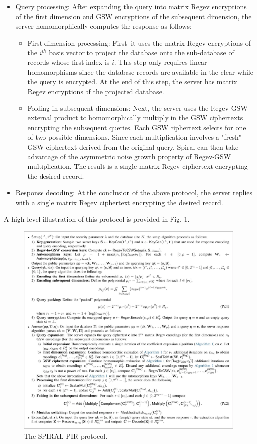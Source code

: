\begin{itemize}
    \item Query processing: After expanding the query into matrix Regev encryptions of the
    first dimension and GSW encryptions of the subsequent dimension, the server
    homomorphically computes the response as follows:

    \begin{itemize}
        \item First dimension processing: First, it uses the matrix Regev encryptions of
        the $i^{th}$ basis vector to project the database onto the sub-database of records
        whose first index is $i$. This step only requires linear homomorphisms since the
        database records are available in the clear while the query is encrypted. At the
        end of this step, the server has matrix Regev encryptions of the projected
        database.

        \item Folding in subsequent dimensions: Next, the server uses the Regev-GSW
        external product to homomorphically multiply in the GSW ciphertexts encrypting the
        subsequent queries. Each GSW ciphertext selects for one of two possible
        dimensions. Since each multiplication involves a "fresh" GSW ciphertext derived
        from the original query, Spiral can then take advantage of the asymmetric noise
        growth property of Regev-GSW multiplication. The result is a single matrix Regev
        ciphertext encrypting the desired record.
    \end{itemize}

    \item Response decoding: At the conclusion of the above protocol, the server replies
    with a single matrix Regev ciphertext encrypting the desired record.
\end{itemize}

A high-level illustration of this protocol is provided in Fig. 1.

\begin{figure}[h]
    \centering
    \includegraphics[width=\linewidth]{Images/Spiral_Protocol.png}
    \caption{The SPIRAL PIR protocol.}
    \label{fig:protocol_overview}
\end{figure}
